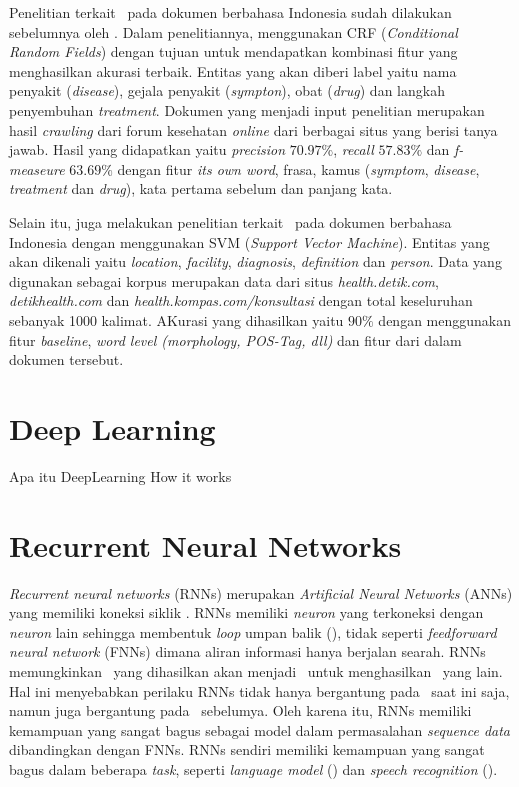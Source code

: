 Penelitian terkait \mer~pada dokumen berbahasa Indonesia sudah dilakukan sebelumnya oleh \cite{skripsiKakRadit}. Dalam penelitiannya, \cite{skripsiKakRadit} menggunakan CRF (\textit{Conditional Random Fields}) dengan tujuan untuk mendapatkan kombinasi fitur yang menghasilkan akurasi terbaik. Entitas yang akan diberi label yaitu nama penyakit (\textit{disease}), gejala penyakit (\textit{sympton}), obat (\textit{drug}) dan langkah penyembuhan \textit{treatment}. Dokumen yang menjadi input penelitian merupakan hasil \textit{crawling} dari  forum kesehatan \textit{online} dari berbagai situs yang berisi tanya jawab. Hasil yang didapatkan yaitu \textit{precision} $ 70.97\% $, \textit{recall} $ 57.83\% $ dan \textit{f-measeure} $ 63.69\% $ dengan fitur \textit{its own word}, frasa, kamus (\textit{symptom}, \textit{disease}, \textit{treatment} dan \textit{drug}), kata pertama sebelum dan panjang kata.

Selain itu, \cite{suwarningsih2014imner} juga melakukan penelitian terkait \mer~pada dokumen berbahasa Indonesia dengan menggunakan SVM (\textit{Support Vector Machine}). Entitas yang akan dikenali yaitu \textit{location}, \textit{facility}, \textit{diagnosis}, \textit{definition} dan \textit{person}. Data yang digunakan sebagai korpus merupakan data dari situs \textit{health.detik.com}, \textit{detikhealth.com} dan \textit{health.kompas.com/konsultasi} dengan total keseluruhan sebanyak 1000 kalimat. AKurasi yang dihasilkan yaitu $ 90\% $ dengan menggunakan fitur \textit{baseline}, \textit{word level (morphology, POS-Tag, dll)} dan fitur dari dalam dokumen tersebut.

\section{Deep Learning}
Apa itu DeepLearning
How it works


\section{Recurrent Neural Networks}\label{sec:rnns}

\textit{Recurrent neural networks} (RNNs) merupakan \textit{Artificial Neural Networks} (ANNs) yang memiliki koneksi siklik \citep{graves2012neural}. RNNs memiliki \textit{neuron} yang terkoneksi dengan \textit{neuron} lain sehingga membentuk \textit{loop} umpan balik (\cite{haykin2009neural}), tidak seperti \textit{feedforward neural network} (FNNs) dimana aliran informasi hanya berjalan searah. RNNs memungkinkan \iob~yang dihasilkan akan menjadi \ioa~untuk menghasilkan \iob~yang lain. Hal ini menyebabkan perilaku RNNs tidak hanya bergantung pada \ioa~saat ini saja, namun juga bergantung pada \iob~sebelumya. Oleh karena itu, RNNs memiliki kemampuan yang sangat bagus sebagai model dalam permasalahan \textit{sequence data} dibandingkan dengan FNNs. RNNs sendiri memiliki kemampuan yang sangat bagus dalam beberapa \textit{task}, seperti \textit{language model} (\cite{mikolov2010recurrent}) dan \textit{speech recognition} (\cite{graves2013speech}).

